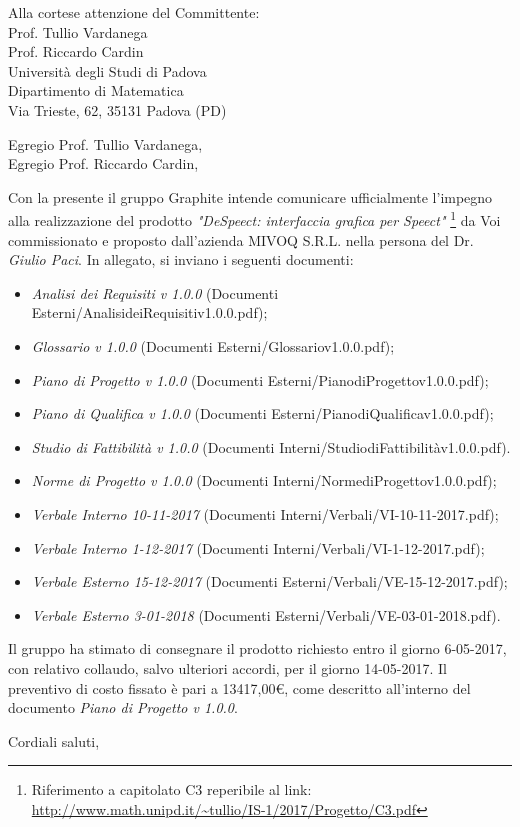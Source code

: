 \documentclass[]{letter}
\begin{document}
\begin{letter}{
		Alla cortese attenzione del Committente: \\
		Prof. Tullio Vardanega \\
		Prof. Riccardo Cardin \\
		Università degli Studi di Padova \\
		Dipartimento di Matematica \\ 
		Via Trieste, 62, 35131 Padova (PD)
	}

\opening{Egregio Prof. Tullio Vardanega, \\ Egregio Prof. Riccardo Cardin,}

Con la presente il gruppo Graphite intende comunicare ufficialmente l’impegno alla realizzazione del prodotto  \textit{"DeSpeect: interfaccia grafica per Speect"} \footnote{Riferimento a capitolato C3 reperibile al link: \url{http://www.math.unipd.it/~tullio/IS-1/2017/Progetto/C3.pdf}} da Voi commissionato e proposto dall'azienda MIVOQ S.R.L. nella persona del Dr. \textit{Giulio Paci}.  In  allegato,  si inviano i seguenti documenti:

\begin{itemize}
	\item \textit{Analisi dei Requisiti v 1.0.0} (Documenti Esterni/AnalisideiRequisitiv1.0.0.pdf);
	\item \textit{Glossario v 1.0.0} (Documenti Esterni/Glossariov1.0.0.pdf);
	\item \textit{Piano di Progetto v 1.0.0} (Documenti Esterni/PianodiProgettov1.0.0.pdf);
	\item \textit{Piano di Qualifica v 1.0.0} (Documenti Esterni/PianodiQualificav1.0.0.pdf);
	\item \textit{Studio di Fattibilità v 1.0.0} (Documenti Interni/StudiodiFattibilitàv1.0.0.pdf).
	\item \textit{Norme di Progetto v 1.0.0} (Documenti Interni/NormediProgettov1.0.0.pdf);
	\item \textit{Verbale Interno 10-11-2017} (Documenti Interni/Verbali/VI-10-11-2017.pdf);
	\item \textit{Verbale Interno 1-12-2017} (Documenti Interni/Verbali/VI-1-12-2017.pdf);
	\item \textit{Verbale Esterno 15-12-2017} (Documenti Esterni/Verbali/VE-15-12-2017.pdf);
	\item \textit{Verbale Esterno 3-01-2018} (Documenti Esterni/Verbali/VE-03-01-2018.pdf).
\end{itemize}

Il gruppo ha stimato di consegnare il prodotto richiesto entro il giorno 6-05-2017, con relativo collaudo, salvo ulteriori accordi, per il giorno 14-05-2017. Il preventivo di costo fissato è pari a 13417,00\euro, come descritto all’interno del documento \textit{Piano di Progetto v 1.0.0}.

\signature{Responsabile di Progetto \\ Graphite}

\closing{Cordiali saluti,}


\end{letter}
\end{document}

